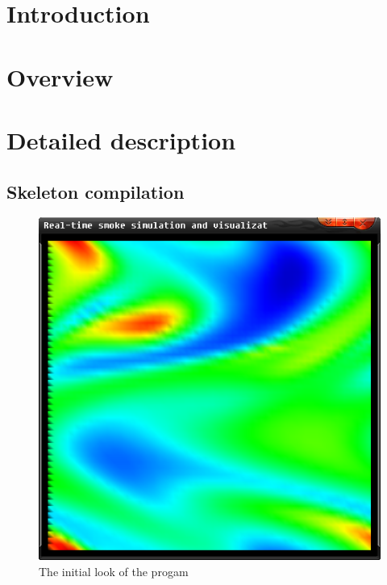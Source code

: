 \documentclass[a4paper,11pt,twoside]{report}
\begin{document}
\newcommand{\coursename}{Visualization (2IV35)}
\newcommand{\doctitle}{Practical assignment }
\newcommand{\docversion}{0.1}
\newcommand{\docdate}{\today}

\newcommand{\imagescalefactor}{0.40}

\dotsspreamble

\tableofcontents

\dotssdocument

\chapter{Introduction}
\chapter{Overview}
\chapter{Detailed description}
	\section{Skeleton compilation}
		\begin{figure}[h]
		\centering
		\includegraphics[scale=\imagescalefactor]{images/step1.png}
		\caption{The initial look of the progam}\label{fig:step1}
		\end{figure}
		\newpage
\end{document}
